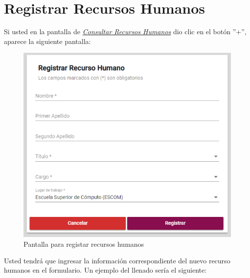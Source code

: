 


    \newpage
        \hypertarget{registrarRH}{}
        \section{Registrar Recursos Humanos}
            Si usted  en la pantalla de \hyperlink{consultarRH}{\textit{Consultar Recursos Humanos}} dio clic en el botón ''+'', aparece la siguiente pantalla:

            \begin{figure}[H]
                \centering
                \hypertarget{registrarUs}{\includegraphics[width=0.7\linewidth]{images/SP1/RegistrarRH}}
                \caption{Pantalla para registar recursos humanos}
                \label{registrarrh}
            \end{figure}

            Usted tendrá que ingresar la información correspondiente del nuevo recurso humanos en el formulario. Un ejemplo del llenado sería el siguiente:

